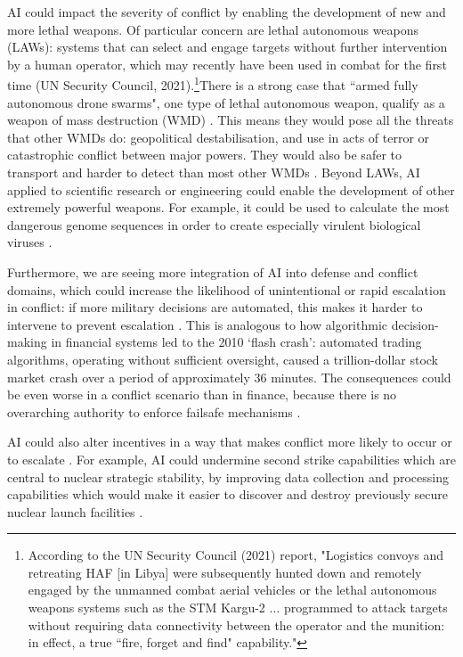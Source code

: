 \documentclass{article}
\begin{document}
AI could impact the severity of conflict by enabling the development of new and more lethal weapons. Of particular concern are lethal autonomous weapons (LAWs): systems that can select and engage targets without further intervention by a human operator, which may recently have been used in combat for the first time (UN Security Council, 2021).\footnote{According to the UN Security Council (2021) report, "Logistics convoys and retreating HAF [in Libya] were subsequently hunted down and remotely engaged by the unmanned combat aerial vehicles or the lethal autonomous weapons systems such as the STM Kargu-2 $\ldots$ programmed to attack targets without requiring data connectivity between the operator and the munition: in effect, a true ``fire, forget and find" capability."}There is a strong case that ``armed fully autonomous drone swarms", one type of lethal autonomous weapon, qualify as a weapon of mass destruction (WMD) \citep{kallenborn_are_2020}. This means they would pose all the threats that other WMDs do: geopolitical destabilisation, and use in acts of terror or catastrophic conflict between major powers. They would also be safer to transport and harder to detect than most other WMDs \citep{aguirre_why_2020}. Beyond LAWs, AI applied to scientific research or engineering could enable the development of other extremely powerful weapons. For example, it could be used to calculate the most dangerous genome sequences in order to create especially virulent biological viruses \citep{obrien_assessing_2020,turchin_classification_2020}.

Furthermore, we are seeing more integration of AI into defense and conflict domains, which could increase the likelihood of unintentional or rapid escalation in conflict: if more military decisions are automated, this makes it harder to intervene to prevent escalation \citep{johnson_artificial_2020,deeks_machine_2018}. This is analogous to how algorithmic decision-making in financial systems led to the 2010 ‘flash crash’: automated trading algorithms, operating without sufficient oversight, caused a trillion-dollar stock market crash over a period of approximately 36 minutes. The consequences could be even worse in a conflict scenario than in finance, because there is no overarching authority to enforce failsafe mechanisms \citep{johnson_artificial_2020}.

AI could also alter incentives in a way that makes conflict more likely to occur or to escalate \citep{zwetsloot_thinking_2019}. For example, AI could undermine second strike capabilities which are central to nuclear strategic stability, by improving data collection and processing capabilities which would make it easier to discover and destroy previously secure nuclear launch facilities \citep{geist_how_2018,lieber_new_2017}.
\end{document}
